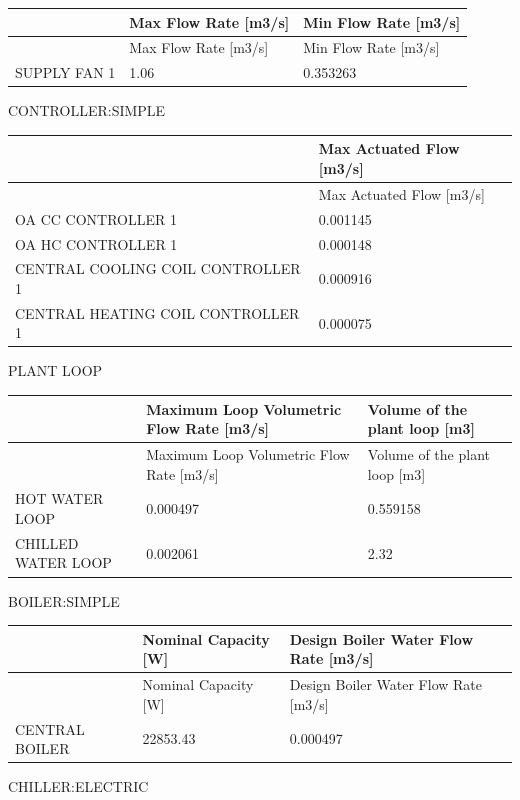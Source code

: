 \begin{longtable}[c]{@{}lll@{}}
\toprule
~ & Max Flow Rate [m3/s] & Min Flow Rate [m3/s] \tabularnewline
\midrule
\endfirsthead

\toprule
~ & Max Flow Rate [m3/s] & Min Flow Rate [m3/s] \tabularnewline
\midrule
\endhead

SUPPLY FAN 1 & 1.06 & 0.353263 \tabularnewline
\bottomrule
\end{longtable}

CONTROLLER:SIMPLE

\begin{longtable}[c]{@{}ll@{}}
\toprule
~ & Max Actuated Flow [m3/s] \tabularnewline
\midrule
\endfirsthead

\toprule
~ & Max Actuated Flow [m3/s] \tabularnewline
\midrule
\endhead

OA CC CONTROLLER 1 & 0.001145 \tabularnewline
OA HC CONTROLLER 1 & 0.000148 \tabularnewline
CENTRAL COOLING COIL CONTROLLER 1 & 0.000916 \tabularnewline
CENTRAL HEATING COIL CONTROLLER 1 & 0.000075 \tabularnewline
\bottomrule
\end{longtable}

PLANT LOOP

\begin{longtable}[c]{>{\raggedright}p{1.5in}>{\raggedright}p{2.62in}>{\raggedright}p{1.87in}}
\toprule
~ & Maximum Loop Volumetric Flow Rate [m3/s] & Volume of the plant loop [m3] \tabularnewline
\midrule
\endfirsthead

\toprule
~ & Maximum Loop Volumetric Flow Rate [m3/s] & Volume of the plant loop [m3] \tabularnewline
\midrule
\endhead

HOT WATER LOOP & 0.000497 & 0.559158 \tabularnewline
CHILLED WATER LOOP & 0.002061 & 2.32 \tabularnewline
\bottomrule
\end{longtable}

BOILER:SIMPLE

\begin{longtable}[c]{>{\raggedright}p{1.5in}>{\raggedright}p{1.56in}>{\raggedright}p{2.93in}}
\toprule
~ & Nominal Capacity [W] & Design Boiler Water Flow Rate [m3/s] \tabularnewline
\midrule
\endfirsthead

\toprule
~ & Nominal Capacity [W] & Design Boiler Water Flow Rate [m3/s] \tabularnewline
\midrule
\endhead

CENTRAL BOILER & 22853.43 & 0.000497 \tabularnewline
\bottomrule
\end{longtable}

CHILLER:ELECTRIC

